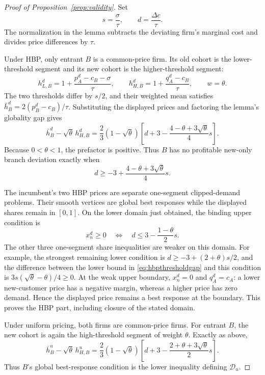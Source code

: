 \documentclass[11pt]{article}
\newcommand{\DC}{\Delta c}
\begin{document}
\begin{proof}[Proof of Proposition~\ref{prop:validity}]
Set
\[
 s=\frac{\sigma}{\tau},
 \qquad
 d=\frac{\DC}{\tau}.
\]
The normalization in the lemma subtracts the deviating firm's marginal cost
and divides price differences by $\tau$.

Under HBP, only entrant $B$ is a common-price firm.  Its old cohort is the
lower-threshold segment and its new cohort is the higher-threshold segment:
\[
 h_{L,B}^d
 =1+\frac{p_A^d-c_B-\sigma}{\tau},
 \qquad
 h_{H,B}^d
 =1+\frac{q_A^d-c_B}{\tau},
 \qquad
 w=\theta.
\]
The two thresholds differ by $s/2$, and their weighted mean satisfies
$\bar h_B^d=2(p_B^d-c_B)/\tau$.  Substituting the displayed prices and
factoring the lemma's globality gap gives
\begin{equation}
 \bar h_B^d-\sqrt{\theta}\,h_{H,B}^d
 =
 \frac{2}{3}(1-\sqrt{\theta})
 \left[
 d+3-\frac{4-\theta+3\sqrt{\theta}}{4}s
 \right].
 \label{eq:hbpthresholdgap}
\end{equation}
Because $0<\theta<1$, the prefactor is positive.  Thus $B$ has no profitable
new-only branch deviation exactly when
\[
 d\geq
 -3+\frac{4-\theta+3\sqrt{\theta}}{4}s.
\]

The incumbent's two HBP prices are separate one-segment clipped-demand
problems.  Their smooth vertices are global best responses while the displayed
shares remain in $[0,1]$.  On the lower domain just obtained, the binding upper
condition is
\[
 x_n^d\geq0
 \quad\Longleftrightarrow\quad
 d\leq3-\frac{1-\theta}{2}s.
\]
The other three one-segment share inequalities are weaker on this domain.  For
example, the strongest remaining lower condition is
$d\geq-3+(2+\theta)s/2$, and the difference between the lower bound in
\eqref{eq:hbpthresholdgap} and this condition is
$3s(\sqrt{\theta}-\theta)/4\geq0$.  At the weak upper boundary,
$x_n^d=0$ and $q_A^d=c_A$: a lower new-customer price has a negative margin,
whereas a higher price has zero demand.  Hence the displayed price remains a
best response at the boundary.  This proves the HBP part, including closure of
the stated domain.

Under uniform pricing, both firms are common-price firms.  For entrant $B$,
the new cohort is again the high-threshold segment of weight $\theta$.
Exactly as above,
\begin{equation}
 \bar h_B^u-\sqrt{\theta}\,h_{H,B}^u
 =
 \frac{2}{3}(1-\sqrt{\theta})
 \left[
 d+3-\frac{2+\theta+3\sqrt{\theta}}{2}s
 \right].
 \label{eq:uniformBgap}
\end{equation}
Thus $B$'s global best-response condition is the lower inequality defining
$\mathcal D_u$.


\end{proof}
\end{document}
